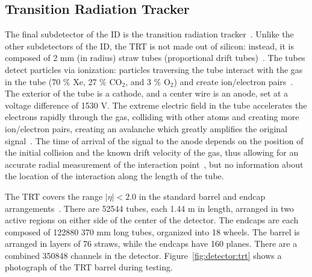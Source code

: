 
\subsection{Transition Radiation Tracker}
\label{detector:ID:TRT}
The final subdetector of the ID is the transition radiation tracker~\cite{ATLASPaper}. Unlike the other subdetectors of the ID, the TRT is not made out of silicon: instead, it is composed of 2 mm (in radius) straw tubes (proportional drift tubes)~\cite{ATLASPaper}. The tubes detect particles via ionization: particles traversing the tube interact with the gas in the tube (70 $\%$ Xe, 27 \% CO$_2$, and 3 \% O$_2$) and create ion/electron pairs~\cite{Detectors,ATLASPaper}. The exterior of the tube is a cathode, and a center wire is an anode, set at a voltage difference of 1530 V. The extreme electric field in the tube accelerates the electrons rapidly through the gas, colliding with other atoms and creating more ion/electron pairs, creating an avalanche which greatly amplifies the original signal~\cite{Detectors}. The time of arrival of the signal to the anode depends on the position of the initial collision and the known drift velocity of the gas, thus allowing for an accurate radial measurement of the interaction point~\cite{TRTReadout}, but no information about the location of the interaction along the length of the tube.

The TRT covers the range $|\eta| < 2.0$ in the standard barrel and endcap arrangements~\cite{TRTPaper}. There are 52544 tubes, each 1.44 m in length, arranged in two active regions on either side of the center of the detector. The endcaps are each composed of 122880 370 mm long tubes, organized into 18 wheels. The barrel is arranged in layers of 76 straws, while the endcaps have 160 planes. There are a combined 350848 channels in the detector. Figure~\ref{fig:detector:trt} shows a photograph of the TRT barrel during testing.

